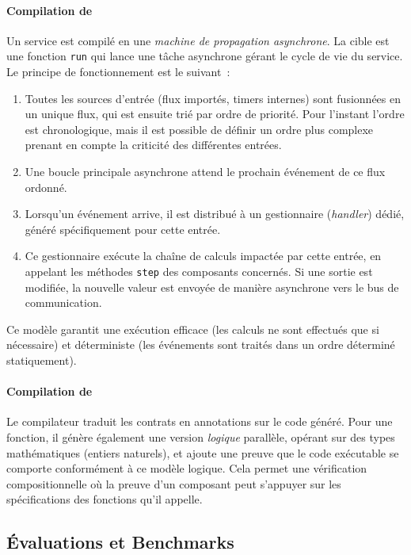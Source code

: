 \paragraph{Compilation de \GRFRP} Un service \GRFRP est compilé en une \emph{machine de propagation
      asynchrone}. La cible est une fonction \texttt{run} qui lance une tâche asynchrone gérant le
cycle de vie du service. Le principe de fonctionnement est le suivant~:
\begin{enumerate}
      \item Toutes les sources d'entrée (flux importés, timers internes) sont fusionnées en un
            unique flux, qui est ensuite trié par ordre de priorité. Pour l'instant l'ordre est
            chronologique, mais il est possible de définir un ordre plus complexe prenant en compte
            la criticité des différentes entrées.
      \item Une boucle principale asynchrone attend le prochain événement de ce flux ordonné.
      \item Lorsqu'un événement arrive, il est distribué à un gestionnaire (\emph{handler}) dédié,
            généré spécifiquement pour cette entrée.
      \item Ce gestionnaire exécute la chaîne de calculs impactée par cette entrée, en appelant les
            méthodes \texttt{step} des composants concernés. Si une sortie est modifiée, la nouvelle
            valeur est envoyée de manière asynchrone vers le bus de communication.
\end{enumerate}
Ce modèle garantit une exécution efficace (les calculs ne sont effectués que si nécessaire) et
déterministe (les événements sont traités dans un ordre déterminé statiquement).

\paragraph{Compilation de \GReusot} Le compilateur traduit les contrats \GReusot en annotations
\Creusot sur le code \Rust généré. Pour une fonction, il génère également une version
\emph{logique} parallèle, opérant sur des types mathématiques (\eg entiers naturels), et ajoute une
preuve que le code exécutable se comporte conformément à ce modèle logique. Cela permet une
vérification compositionnelle où la preuve d'un composant peut s'appuyer sur les spécifications
des fonctions qu'il appelle.

\subsection{Évaluations et Benchmarks}

